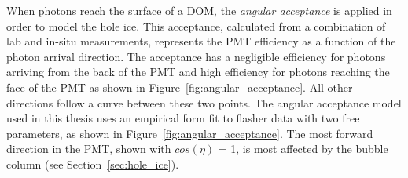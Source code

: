 When photons reach the surface of a DOM, the \emph{angular acceptance} is applied in order to model the hole ice.
This acceptance, calculated from a combination of lab and in-situ measurements, represents the PMT efficiency as a function of the photon arrival direction.
The acceptance has a negligible efficiency for photons arriving from the back of the PMT and high efficiency for photons reaching the face of the PMT as shown in Figure~\ref{fig:angular_acceptance}.
All other directions follow a curve between these two points.
The angular acceptance model used in this thesis uses an empirical form fit to flasher data with two free parameters, as shown in Figure~\ref{fig:angular_acceptance}.
The most forward direction in the PMT, shown with $cos(\eta)$ = 1, is most affected by the bubble column (see Section~\ref{sec:hole_ice}). 

